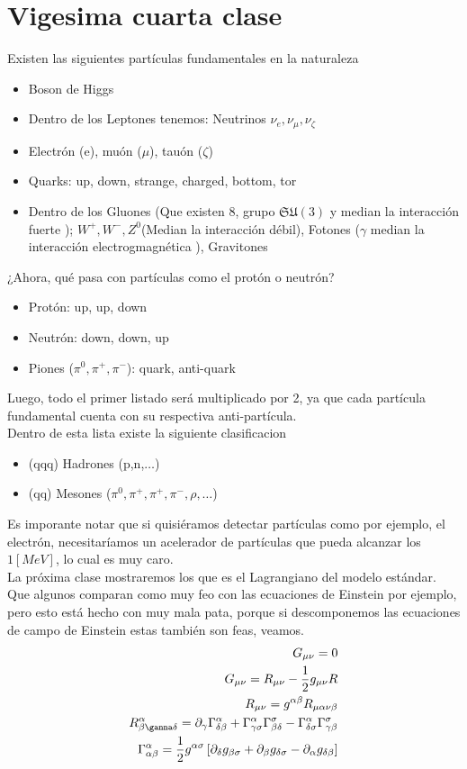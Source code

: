 \documentclass[../main.tex]{subfiles}
\begin{document}
\section{Vigesima cuarta clase}
Existen las siguientes partículas fundamentales en la naturaleza
\begin{itemize}
  \item Boson de Higgs
  \item Dentro de los Leptones tenemos: Neutrinos $\nu_e,\nu_\mu,\nu_\zeta$
  \item Electrón (e), muón ($\mu$), tauón ($\zeta$)
  \item Quarks: up, down, strange, charged, bottom, tor
  \item Dentro de los Gluones (Que existen 8, grupo $\mathfrak{SU}(3)$ y median la interacción fuerte ); $W^+ , W^-, Z^0$(Median la interacción débil), Fotones ($\gamma$ median la interacción electrogmagnética ), Gravitones
\end{itemize}
¿Ahora, qué pasa con partículas como el protón o neutrón?
\begin{itemize}
  \item Protón: up, up, down
  \item Neutrón: down, down, up
  \item Piones ($\pi^0,\pi^+,\pi^-$): quark, anti-quark
\end{itemize}
Luego, todo el primer listado será multiplicado por 2, ya que cada partícula fundamental cuenta con su respectiva anti-partícula. \\
Dentro de esta lista existe la siguiente clasificacion
\begin{itemize}
  \item(qqq) Hadrones (p,n,$\dots$)
  \item (qq) Mesones ($\pi^0,\pi^+,\pi^+,\pi^-,\rho,\dots$)
\end{itemize}
Es imporante notar que si quisiéramos detectar partículas como por ejemplo, el electrón, necesitaríamos un acelerador de partículas que pueda alcanzar los $1[MeV]$, lo cual es muy caro. \\
La próxima clase mostraremos los que es el Lagrangiano del modelo estándar. Que algunos comparan como muy feo con las ecuaciones de Einstein por ejemplo, pero esto está hecho con muy mala pata, porque si descomponemos las ecuaciones de campo de Einstein estas también son feas, veamos.
\begin{align}
 G_{\mu \nu} =  0\\
 G_{\mu \nu} = R_{\mu\nu} - \frac{1}{2}g_{\mu\nu}R \\
 R_{\mu\nu} = g^{\alpha \beta}R_{\mu \alpha \nu \beta} \\
  R^{\alpha}_{\beta \ganna \delta}  =\partial_\gamma \Gamma^\alpha_{\delta\beta}  +\Gamma^\alpha_{\gamma \sigma} \Gamma^\sigma_{\beta \delta} - \Gamma^\alpha_{\delta \sigma}\Gamma^\sigma_{\gamma \beta} \\
  \Gamma^\alpha_{\alpha \beta} = \frac{1}{2}g^{\alpha \sigma} \left[ \partial_\delta g_{\beta \sigma} + \partial_{\beta} g_{\delta \sigma} - \partial_{\alpha}g_{\delta \beta} \right]
\end{align}
\end{document}
